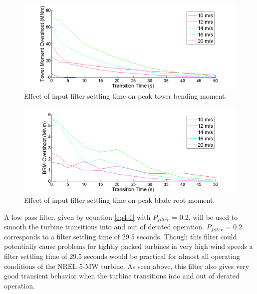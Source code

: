\begin{figure}[htbp]
	\centering
		\includegraphics[trim = {1cm 0 2cm 0}, clip, width = \linewidth]{Figures/ch4Figures/fig4-18.png}
		
	\caption{Effect of input filter settling time on peak tower bending moment.}
	\label{fig4-18}
\end{figure}

\begin{figure}[htbp]
	\centering
		\includegraphics[trim = {1cm 0 2cm 0}, clip, width = \linewidth]{Figures/ch4Figures/fig4-19.png}
		
	\caption{Effect of input filter settling time on peak blade root moment.}
	\label{fig4-19}
\end{figure}

A low pass filter, given by equation \ref{eq4-1} with $P_{filter}$ = 0.2, will be used to smooth the turbine transitions into and out of derated operation.  $P_{filter}$ = 0.2 corresponds to a filter settling time of 29.5 seconds. Though this filter could potentially cause problems for tightly packed turbines in very high wind speeds a filter settling time of 29.5 seconds would be practical for almost all operating conditions of the NREL 5-MW turbine. As seen above, this filter also gives very good transient behavior when the turbine transitions into and out of derated operation. 


